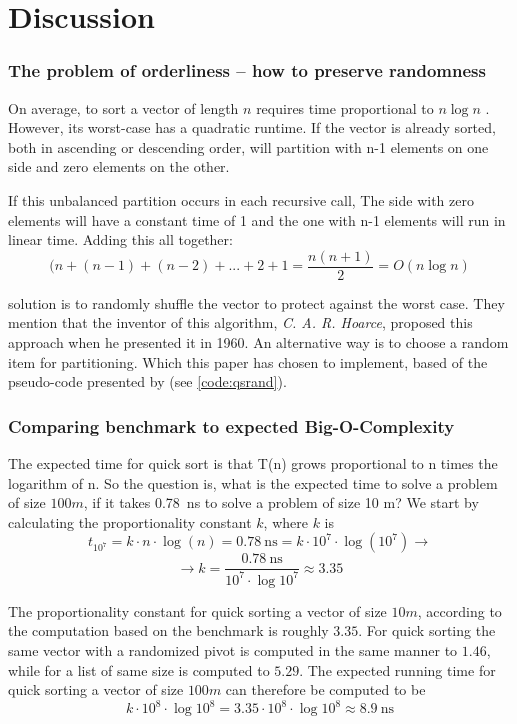 \documentclass[a4paper, 11pt]{article}
\begin{document}
    \section*{Discussion}
    \label{sec:discussion}
    \subsubsection*{The problem of orderliness -- how to preserve randomness}
    On average, to sort a vector of length $n$ requires time 
    proportional to $n\log n$ \parencite{Segeqick2011Alg4th}. 
    However, 
    its worst-case has a quadratic runtime. If the vector is 
    already sorted, both in ascending or descending order, 
    will partition with n-1 elements on one side and zero 
    elements on the other. 

    If this unbalanced partition occurs in each recursive call, 
    The side with zero elements will have a constant time of 1 and
    the one with n-1 elements will run in linear time.
    Adding this all together:
    \[ (n + (n-1) + (n-2)+ ... + 2 + 1 = \frac{n(n+1)}{2} = O(n\log n) \]

    \textcite{Segeqick2011Alg4th} solution is to randomly shuffle 
    the vector to protect against the worst case. They mention 
    that the inventor of this algorithm, \emph{C. A. R. Hoarce},
    proposed this approach when he presented it in 1960.
    An alternative way is to choose a random item for 
    partitioning. Which this paper has chosen to implement, based 
    of the pseudo-code presented by \textcite{CormenThomasH2022ItA} 
    (see \autoref{code:qsrand}).

    \subsubsection*{Comparing benchmark to expected Big-O-Complexity}
    The expected time for quick sort is that T(n) grows proportional
    to n times the logarithm of n.
    So the question is, what is the expected time to solve a problem of size
    $100 m$, if it takes \SI{0.78}{\nano\second} to solve a problem of size 10 m?
    We start by calculating the proportionality constant $k$, 
    where $k$ is 
\[ t_{10^7} = k \cdot n \cdot \log(n) = \SI{0.78}{\nano\second} = k \cdot 10^7 \cdot \log(10^7) \rightarrow \]
\[ \rightarrow k = \frac{\SI{0.78}{\nano\second}}{10^7 \cdot \log 10^7} \approx 3.35\]
    
    The proportionality constant for quick sorting a vector of size $10m$, 
    according to the computation based on the benchmark 
    is roughly $3.35$. For quick sorting the same vector with a randomized pivot
    is computed in the same manner to $1.46$, 
    while for a list of same size is computed to $5.29$. 
    The expected running time for quick sorting a vector of size $100 m$ 
    can therefore be computed to be 
    \[ k \cdot 10^8 \cdot \log 10^8 = 3.35 \cdot 10^8 \cdot \log 10^8 \approx \SI{8.9}{\nano\second} \]
\end{document}
